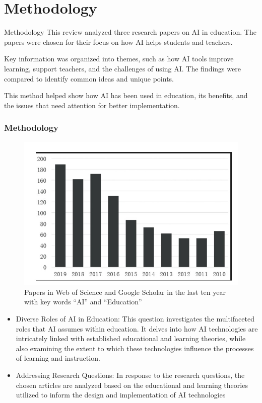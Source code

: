 \documentclass[serif, aspectratio=169]{beamer}
\begin{document}
\section{Methodology}
\begin{frame}{Methodology}
    This review analyzed three research papers on AI in education. The papers were chosen for their focus on how AI helps students and teachers.

Key information was organized into themes, such as how AI tools improve learning, support teachers, and the challenges of using AI. The findings were compared to identify common ideas and unique points.

This method helped show how AI has been used in education, its benefits, and the issues that need attention for better implementation.
\end{frame}


\begin{frame}
	\frametitle<presentation>{Methodology}
	\begin{figure}
		\centering
			\includegraphics[width=.5\textwidth]{pic/picture_2.jpg}
		\caption{Papers in Web of Science and Google Scholar in the last ten year with key words “AI” and “Education”}
	\end{figure}
\end{frame}

\begin{frame}
\begin{itemize}
\item Diverse Roles of AI in Education:
This question investigates the multifaceted roles that AI assumes within education. It delves into how AI technologies are intricately linked with established educational and learning theories, while also examining the extent to which these technologies influence the processes of learning and instruction.
\item Addressing Research Questions:
In response to the research questions, the chosen articles are analyzed based on the educational and learning theories utilized to inform the design and implementation of AI technologies
  
   \end{itemize} 
\end{frame}
\end{document}
